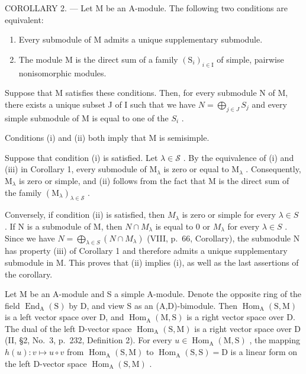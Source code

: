 COROLLARY 2. --- Let M be an A-module. The following two conditions are equivalent:

\begin{enumerate}
\def\labelenumi{(\roman{enumi})}
\item
  Every submodule of M admits a unique supplementary submodule.
\item
  The module M is the direct sum of a family \((\mathrm{S}_{i})_{i\in\mathrm{I}}\) of simple, pairwise nonisomorphic modules.
\end{enumerate}

Suppose that M satisfies these conditions. Then, for every submodule N of M, there exists a unique subset J of I such that we have \(N = \bigoplus_{j \in J} S_j\) and every simple submodule of M is equal to one of the \(S_i\) .

Conditions (i) and (ii) both imply that M is semisimple.

Suppose that condition (i) is satisfied. Let \(\lambda \in \mathcal{S}\) . By the equivalence of (i) and (iii) in Corollary 1, every submodule of \(\mathrm{M}_{\lambda}\) is zero or equal to \(\mathrm{M}_{\lambda}\) . Consequently, \(\mathrm{M}_{\lambda}\) is zero or simple, and (ii) follows from the fact that \(\mathrm{M}\) is the direct sum of the family \((\mathrm{M}_{\lambda})_{\lambda \in \mathcal{S}}\) .

Conversely, if condition (ii) is satisfied, then \(M_{\lambda}\) is zero or simple for every \(\lambda \in S\) . If N is a submodule of M, then \(N \cap M_{\lambda}\) is equal to 0 or \(M_{\lambda}\) for every \(\lambda \in S\) . Since we have \(N = \bigoplus_{\lambda \in S} (N \cap M_{\lambda})\) (VIII, p.~66, Corollary), the submodule N has property (iii) of Corollary 1 and therefore admits a unique supplementary submodule in M. This proves that (ii) implies (i), as well as the last assertions of the corollary.

Let M be an A-module and S a simple A-module. Denote the opposite ring of the field \(\operatorname{End}_{\mathrm{A}}(\mathrm{S})\) by D, and view S as an (A,D)-bimodule. Then \(\operatorname{Hom}_{\mathrm{A}}(\mathrm{S},\mathrm{M})\) is a left vector space over D, and \(\operatorname{Hom}_{\mathrm{A}}(\mathrm{M},\mathrm{S})\) is a right vector space over D. The dual of the left D-vector space \(\operatorname{Hom}_{\mathrm{A}}(\mathrm{S},\mathrm{M})\) is a right vector space over D (II, §2, No.~3, p.~232, Definition 2). For every \(u \in \operatorname{Hom}_{\mathrm{A}}(\mathrm{M},\mathrm{S})\) , the mapping \(h(u): v \mapsto u \circ v\) from \(\operatorname{Hom}_{\mathrm{A}}(\mathrm{S},\mathrm{M})\) to \(\operatorname{Hom}_{\mathrm{A}}(\mathrm{S},\mathrm{S}) = \mathrm{D}\) is a linear form on the left D-vector space \(\operatorname{Hom}_{\mathrm{A}}(\mathrm{S},\mathrm{M})\) .

